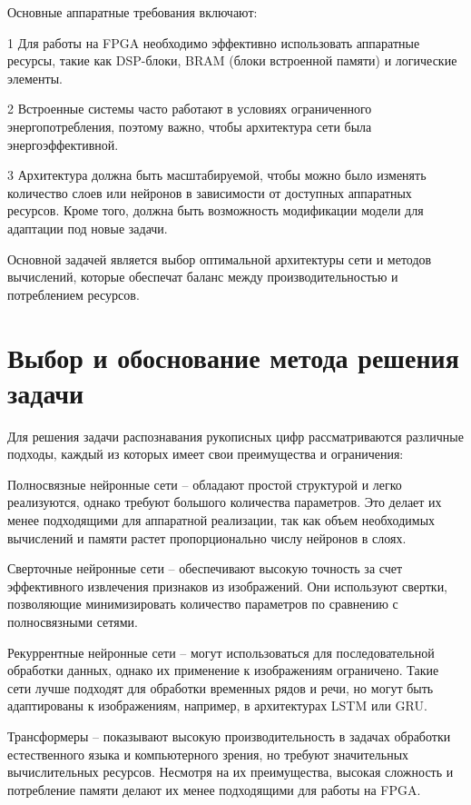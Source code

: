 Основные аппаратные требования включают:

  1 Для работы на FPGA необходимо эффективно использовать аппаратные ресурсы, 
такие как DSP-блоки, BRAM (блоки встроенной памяти) и логические элементы.

  2 Встроенные системы часто работают в условиях ограниченного 
энергопотребления, поэтому важно, чтобы архитектура сети была 
энергоэффективной.

  3 Архитектура должна быть масштабируемой, чтобы можно было изменять 
количество слоев или нейронов в зависимости от доступных аппаратных ресурсов. 
Кроме того, должна быть возможность модификации модели для адаптации под новые
задачи.

Основной задачей является выбор оптимальной архитектуры сети и методов 
вычислений, которые обеспечат баланс между производительностью и потреблением 
ресурсов.

\section{Выбор и обоснование метода решения задачи}
\hspace*{12.5 mm}Для решения задачи распознавания рукописных цифр 
рассматриваются различные подходы, каждый из которых имеет свои преимущества и 
ограничения:

Полносвязные нейронные сети  – обладают простой структурой и легко реализуются, 
однако требуют большого количества параметров. Это делает их менее подходящими 
для аппаратной реализации, так как объем необходимых вычислений и памяти растет
пропорционально числу нейронов в слоях.

Сверточные нейронные сети – обеспечивают высокую точность за счет эффективного 
извлечения признаков из изображений. Они используют свертки, позволяющие 
минимизировать количество параметров по сравнению с полносвязными сетями. 

Рекуррентные нейронные сети – могут использоваться для последовательной 
обработки данных, однако их применение к изображениям ограничено. Такие 
сети лучше подходят для обработки временных рядов и речи, но могут быть 
адаптированы к изображениям, например, в архитектурах LSTM или GRU.\@

Трансформеры – показывают высокую производительность в задачах обработки 
естественного языка и компьютерного зрения, но требуют значительных 
вычислительных ресурсов. Несмотря на их преимущества, высокая сложность и 
потребление памяти делают их менее подходящими для работы на FPGA.\@


